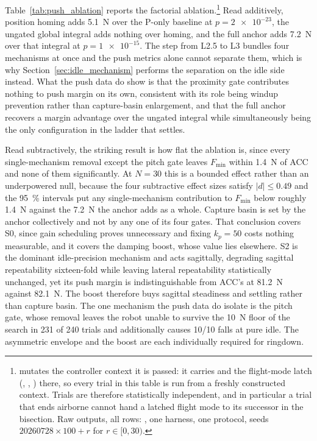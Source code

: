 \documentclass[a4paper,fleqn]{cas-dc}
\begin{document}
Table~\ref{tab:push_ablation} reports the factorial ablation.\footnote{ mutates the controller context it is passed: it carries  and the flight-mode latch (, , ) there, so every trial in this table is run from a freshly constructed context. Trials are therefore statistically independent, and in particular a trial that ends airborne cannot hand a latched flight mode to its successor in the bisection. Raw outputs, all rows: , one harness, one protocol, seeds $\num{20260728}{\times}100+r$ for $r\in[0,30)$.}
Read additively, position homing adds \SI{5.1}{N} over the P-only baseline at
$p{=}\num{2e-23}$, the ungated global integral adds nothing over homing, and the
full anchor adds \SI{7.2}{N} over that integral at $p{=}\num{1e-15}$. The step
from L2.5 to L3 bundles four mechanisms at once and the push metrics alone cannot
separate them, which is why Section~\ref{sec:idle_mechanism} performs the
separation on the idle side instead. What the push data do show is that the
proximity gate contributes nothing to push margin on its own, consistent with its
role being windup prevention rather than capture-basin enlargement, and that the
full anchor recovers a margin advantage over the ungated integral while
simultaneously being the only configuration in the ladder that settles.

Read subtractively, the striking result is how flat the ablation is, since every
single-mechanism removal except the pitch gate leaves $F_{\min}$ within
\SI{1.4}{N} of ACC and none of them significantly. At $N{=}30$ this is a bounded
effect rather than an underpowered null, because the four subtractive effect
sizes satisfy $|d|{\le}0.49$ and the \SI{95}{\percent} intervals put any
single-mechanism contribution to $F_{\min}$ below roughly \SI{1.4}{N} against the
\SI{7.2}{N} the anchor adds as a whole. Capture basin is set by the anchor
collectively and not by any one of its four gates. That conclusion covers S0,
since gain scheduling proves unnecessary and fixing $k_p{=}50$ costs nothing
measurable, and it covers the damping boost, whose value lies elsewhere. S2 is
the dominant idle-precision mechanism and acts sagittally, degrading sagittal
repeatability sixteen-fold while leaving lateral repeatability statistically
unchanged, yet its push margin is indistinguishable from ACC's at \SI{81.2}{N}
against \SI{82.1}{N}. The boost therefore buys sagittal steadiness and settling
rather than capture basin. The one mechanism the push data do isolate is the
pitch gate, whose removal leaves the robot unable to survive the \SI{10}{N} floor
of the search in \num{231} of \num{240} trials and additionally causes
\num{10}/\num{10} falls at pure idle. The asymmetric envelope and the boost are
each individually required for ringdown.
\end{document}
